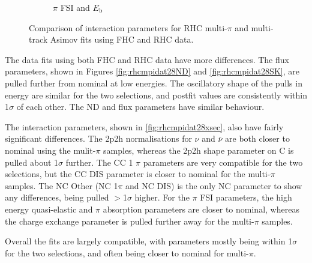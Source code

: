 \begin{figure}[t]
\begin{subfigure}{0.49\textwidth}
  \caption{$\pi$ FSI and $E_{\mathrm{b}}$}
\end{subfigure}
\caption{Comparison of interaction parameters for RHC multi-$\pi$ and multi-track Asimov fits using FHC and RHC data.}
\label{fig:rhcmpiasmvxsec}
\end{figure}

The data fits using both FHC and RHC data have more differences. The flux parameters, shown in Figures \ref{fig:rhcmpidat28ND} and \ref{fig:rhcmpidat28SK}, are pulled further from nominal at low energies. The oscillatory shape of the pulls in energy are similar for the two selections, and postfit values are consistently within 1$\sigma$ of each other. The ND and \SK flux parameters have similar behaviour.
 
The interaction parameters, shown in \ref{fig:rhcmpidat28xsec}, also have fairly significant differences. The 2p2h normalisations for $\nu$ and $\bar{\nu}$ are both closer to nominal using the mulit-$\pi$ samples, whereas the 2p2h shape parameter on C is pulled about 1$\sigma$ further. The CC 1 $\pi$ parameters are very compatible for the two selections, but the CC DIS parameter is closer to nominal for the multi-$\pi$ samples. The NC Other (NC 1$\pi$ and NC DIS) is the only NC parameter to show any differences, being pulled $>$1$\sigma$ higher. For the $\pi$ FSI parameters, the high energy quasi-elastic and $\pi$ absorption parameters are closer to nominal, whereas the charge exchange parameter is pulled further away for the multi-$\pi$ samples.

Overall the fits are largely compatible, with parameters mostly being within 1$\sigma$ for the two selections, and often being closer to nominal for multi-$\pi$.

